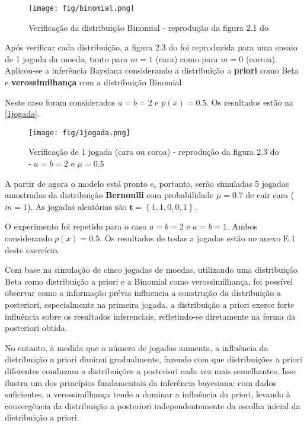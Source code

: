 \documentclass{article}
\begin{document}
  \begin{figure}[ht]
  	\centering %
  	\texttt{[image: fig/binomial.png]} %
  	\caption{Verificação da distribuição Binomial - reprodução da figura 2.1 do \cite{Bishop2006}} %
  	\label{binomial} %
  \end{figure} 
  
  Após verificar cada distribuição, a figura 2.3 do \cite{Bishop2006} foi reproduzida para uma ensaio de 1 jogada da moeda, tanto para $m = 1$ (cara) como para $m = 0$ (corroa). Aplicou-se a inferência Baysiana considerando a distribuição a \textbf{priori} como Beta e \textbf{verossimilhança} com a distribuição Binomial. 
  
  Neste caso foram considerados $a=b=2$ e $p(x)=0.5$. Os resultados estão na \autoref{1jogada}.
  
  \begin{figure}[ht]
  	\centering %
  	\texttt{[image: fig/1jogada.png]} %
  	\caption{Verificação de 1 jogada (cara ou coroa) - reprodução da figura 2.3 do \cite{Bishop2006} - $a=b=2$ e $\mu=0.5$} %
  	\label{1jogada} %
  \end{figure} 
  
  
  A partir de agora o modelo está pronto e, portanto, serão simuladas 5 jogadas amostradas da distribuição \textbf{Bernoulli} com probabilidade $\mu=0.7$ de cair cara ($m=1$). As jogadas aleatórias são $\mathbf{t}=\left\{1,1,0,0,1\right\}$.
  
  O experimento foi repetido para o caso $a=b=2$ e $a=b=1$. Ambos considerando $p(x)=0.5$. Os resultados de todas a jogadas estão no anexo E.1 deste exercício.
  
  Com base na simulação de cinco jogadas de moedas, utilizando uma distribuição Beta como distribuição a priori e a Binomial como verossimilhança, foi possível observar como a informação prévia influencia a construção da distribuição a posteriori, especialmente na primeira jogada, a distribuição a priori exerce forte influência sobre os resultados inferenciais, refletindo-se diretamente na forma da posteriori obtida.
  
  No entanto, à medida que o número de jogadas aumenta, a influência da distribuição a priori diminui gradualmente, fazendo com que distribuições a priori diferentes conduzam a distribuições a posteriori cada vez mais semelhantes. Isso ilustra um dos princípios fundamentais da inferência bayesiana: com dados suficientes, a verossimilhança tende a dominar a influência da priori, levando à convergência da distribuição a posteriori independentemente da escolha inicial da distribuição a priori. 
 
\end{document}
